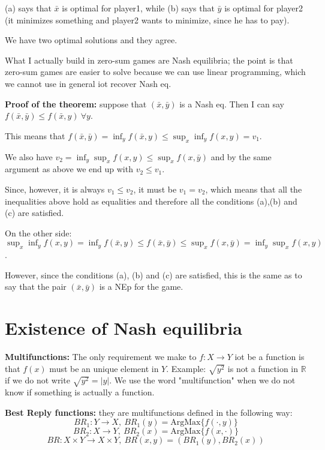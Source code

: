 \begin{enumerate}
	\noindent (a) says that $\bar{x}$ is optimal for player1, while (b) says 
	that $\bar{y}$ is optimal for player2 (it minimizes something and 
	player2 wants to minimize, since he has to pay).
	
	\noindent We have two optimal solutions and they agree.
	
	\noindent What I actually build in zero-sum games are Nash equilibria; 
	the point is that zero-sum games are easier to solve because we can use 
	linear programming, which we cannot use in general iot recover Nash eq.
	
	\bigskip
	\noindent \textbf{Proof of the theorem:} suppose that $(\bar{x},\bar{y})$ 
	is a Nash eq. Then I can say $f(\bar{x},\bar{y}) \leq f(\bar{x},y) ~\forall y$.
	
	\noindent This means that $f(\bar{x},\bar{y}) = \inf_y{f(\bar{x},y) \leq \sup_x{\inf_y{f(x,y)}}} = v_1$.
	
	\noindent We also have $v_2 = \inf_y{\sup_x{f(x,y)}} \leq 
	\sup_x{f(x,\bar{y})}$ and by the same argument as above we end up with 
	$v_2 \leq v_1$.	
	
	\noindent Since, however, it is always $v_1 \leq v_2$, it must be $v_1 =
	v_2$, which means that all the inequalities above hold as equalities and 
	therefore all the conditions (a),(b) and (c) are satisfied.
	
	\noindent On the other side: 
	$\sup_x{\inf_y{f(x,y)}} = \inf_y{f(\bar{x},y)} \leq f(\bar{x},\bar{y}) 
	\leq \sup_x{f(x,\bar{y})} = \inf_y{\sup_x{f(x,y)}}$.
	
	\noindent However, since the conditions (a), (b) and (c) are satisfied, this 
	is the same as to say that the pair $(\bar{x},\bar{y})$ is a NEp for the game.
\end{enumerate}

\section*{Existence of Nash equilibria}

\noindent \textbf{Multifunctions:} The only requirement we make to 
$f: X \rightarrow Y$ iot be a function is that $f(x)$ must be an unique 
element in $Y$. Example: $\sqrt{y^2}$ is not a function in $\mathbb{R}$ 
if we do not write $\sqrt{y^2}=|y|$. We use the word "multifunction" 
when we do not know if something is actually a function.

\bigskip
\noindent \textbf{Best Reply functions:} they are multifunctions defined in the following way:
\[
	BR_1: Y \rightarrow X, ~BR_1(y) = \text{ArgMax}\{f(\cdot,y)\}
\]
\[
	BR_2: X \rightarrow Y, ~BR_2(x) = \text{ArgMax}\{f(x,\cdot)\}
\]
\[
	BR: X \times Y \rightarrow X \times Y, ~BR(x,y) = (BR_1(y),BR_2(x))
\]


